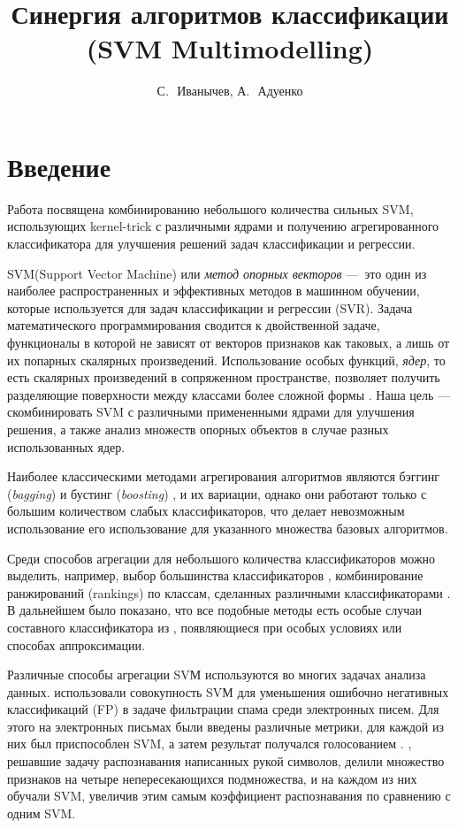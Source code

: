 \documentclass[12pt,twoside]{article}
\title
    {Синергия алгоритмов классификации (SVM Multimodelling)}
\author
    {С.\,~Иванычев, А.\,~Адуенко}
\begin{document}
\maketitle

\section{Введение}
Работа посвящена комбинированию небольшого количества сильных SVM, использующих kernel-trick с различными ядрами и получению агрегированного классификатора для улучшения решений задач классификации и регрессии.

    SVM(Support Vector Machine) или \emph{метод опорных векторов}\cite{Cortes1995, Boser1992} ---~это один из наиболее распространенных и эффективных методов в машинном обучении, которые используется для задач классификации и регрессии (SVR). Задача математического программирования сводится к двойственной задаче, функционалы в которой не зависят от векторов признаков как таковых, а лишь от их попарных скалярных произведений. Использование особых функций, \emph{ядер}, то есть скалярных произведений в сопряженном пространстве, позволяет получить разделяющие поверхности между классами более сложной формы \cite{Smola2004}. Наша цель --- скомбинировать SVM
    с различными примененными ядрами для улучшения решения, а также анализ множеств опорных объектов в случае разных использованных ядер.

    Наиболее классическими методами агрегирования алгоритмов являются
    бэггинг (\emph{bagging})\cite{Breiman1996} и бустинг (\emph{boosting}) \cite{Freund1995}, и их
    вариации, однако они работают только с  большим количеством слабых классификаторов, что делает невозможным использование его использование для указанного множества базовых алгоритмов.

    Среди способов агрегации для небольшого количества классификаторов можно
    выделить, например, выбор большинства классификаторов \cite{Franke1992},
    комбинирование ранжирований (rankings) по классам, сделанных различными
    классификаторами \cite{Ho1994}. В дальнейшем было показано, что все подобные
    методы есть особые случаи составного классификатора из \cite{Kittler1996},
    появляющиеся при особых условиях или способах аппроксимации.

    Различные способы агрегации SVМ используются во многих задачах анализа данных.
    \cite{Martin-merino2007} использовали совокупность SVМ для уменьшения ошибочно негативных классификаций (FP) в задаче фильтрации спама среди электронных писем.
    Для этого на электронных письмах были введены различные метрики, для каждой из них был приспособлен SVM, а затем результат получался голосованием \cite{Kittler1996}.
    \cite{Gorgevik2005}, решавшие задачу распознавания написанных рукой символов, делили множество признаков на четыре непересекающихся подмножества, и на каждом из них обучали SVM, увеличив этим самым коэффициент распознавания по сравнению с одним SVM.
\end{document}

